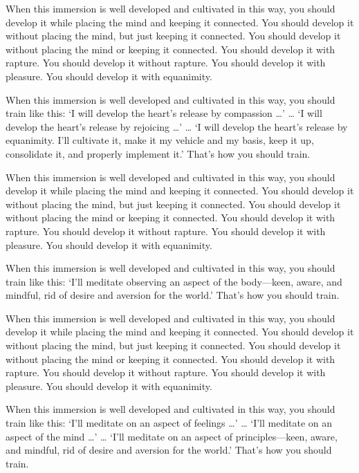 \documentclass[12pt,openany]{book}%
\begin{document}
When this immersion is well developed and cultivated in this way, you should develop it while placing the mind and keeping it connected. You should develop it without placing the mind, but just keeping it connected. You should develop it without placing the mind or keeping it connected. You should develop it with rapture. You should develop it without rapture. You should develop it with pleasure. You should develop it with equanimity. 

When this immersion is well developed and cultivated in this way, you should train like this: ‘I will develop the heart’s release by compassion …’ … ‘I will develop the heart’s release by rejoicing …’ … ‘I will develop the heart’s release by equanimity. I’ll cultivate it, make it my vehicle and my basis, keep it up, consolidate it, and properly implement it.’ That’s how you should train. 

When this immersion is well developed and cultivated in this way, you should develop it while placing the mind and keeping it connected. You should develop it without placing the mind, but just keeping it connected. You should develop it without placing the mind or keeping it connected. You should develop it with rapture. You should develop it without rapture. You should develop it with pleasure. You should develop it with equanimity. 

When this immersion is well developed and cultivated in this way, you should train like this: ‘I’ll meditate observing an aspect of the body—keen, aware, and mindful, rid of desire and aversion for the world.’ That’s how you should train. 

When this immersion is well developed and cultivated in this way, you should develop it while placing the mind and keeping it connected. You should develop it without placing the mind, but just keeping it connected. You should develop it without placing the mind or keeping it connected. You should develop it with rapture. You should develop it without rapture. You should develop it with pleasure. You should develop it with equanimity. 

When this immersion is well developed and cultivated in this way, you should train like this: ‘I’ll meditate on an aspect of feelings …’ … ‘I’ll meditate on an aspect of the mind …’ … ‘I’ll meditate on an aspect of principles—keen, aware, and mindful, rid of desire and aversion for the world.’ That’s how you should train. 
\end{document}

